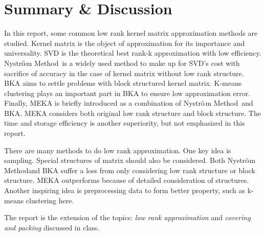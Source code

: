 \documentclass[12pt, a4paper, oneside]{article}
\newcommand{\nysm}{Nystr$\ddot{\rm o}$m Method}
\begin{document}
\section{Summary \& Discussion} %
\label{sec:sd}

In this report, some common low rank kernel matrix approximation methods are studied. Kernel matrix is the object of approximation for its importance and universality. SVD is the theoretical best rank-k approximation with low efficiency. \nysm\ is a widely used method to make up for SVD's cost with sacrifice of accuracy in the case of kernel matrix without low rank structure. BKA aims to settle problems with block structured kernel matrix. K-means clustering plays an important part in BKA to ensure low approximation error. Finally, MEKA is briefly introduced as a combination of \nysm\ and BKA. MEKA considers both original low rank structure and block structure. The time and storage efficiency is another superiority, but not emphasized in this report.

There are many methods to do low rank approximation. One key idea is sampling. Special structures of matrix should also be considered. Both \nysm and BKA suffer a loss from only considering low rank structure or block structure. MEKA outperforms because of detailed consideration of structures. Another inspiring idea is preprocessing data to form better property, such as k-means clustering here.

The report is the extension of the topics: \textit{low rank approximation} and \textit{covering and packing} discussed in class.




\end{document}
